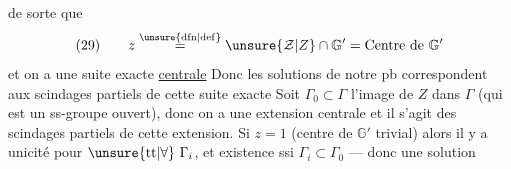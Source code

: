 de sorte que
\[
(29)\qquad z\overset{\unsure{\mathrm{dfn}|\mathrm{def}}}{=}\unsure{\mathcal Z|Z}\cap\mathbb G'=\text{Centre de }\mathbb G'
\]
et on a une suite exacte \uline{centrale}
Donc les solutions de notre pb  correspondent aux scindages partiels de cette suite exacte
Soit $\Gamma_0\subset\Gamma$ l'image de $Z$ dans $\Gamma$
(qui est un ss-groupe ouvert), donc on a une extension centrale
et il s'agit des scindages partiels de cette extension. Si $z=1$
(centre de $\mathbb G'$ trivial) alors il y a unicité pour $\unsure{\mathrm{tt}|\forall}\ \Gamma_i$, et existence ssi $\Gamma_i\subset\Gamma_0$ --- donc une solution  

